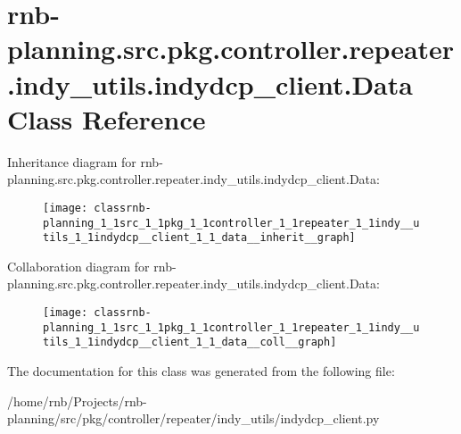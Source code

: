 \hypertarget{classrnb-planning_1_1src_1_1pkg_1_1controller_1_1repeater_1_1indy__utils_1_1indydcp__client_1_1_data}{}\section{rnb-\/planning.src.\+pkg.\+controller.\+repeater.\+indy\+\_\+utils.\+indydcp\+\_\+client.\+Data Class Reference}
\label{classrnb-planning_1_1src_1_1pkg_1_1controller_1_1repeater_1_1indy__utils_1_1indydcp__client_1_1_data}


Inheritance diagram for rnb-\/planning.src.\+pkg.\+controller.\+repeater.\+indy\+\_\+utils.\+indydcp\+\_\+client.\+Data\+:\nopagebreak
\begin{figure}[H]
\begin{center}
\leavevmode
\texttt{[image: classrnb-planning\_1\_1src\_1\_1pkg\_1\_1controller\_1\_1repeater\_1\_1indy\_\_utils\_1\_1indydcp\_\_client\_1\_1\_data\_\_inherit\_\_graph]}
\end{center}
\end{figure}


Collaboration diagram for rnb-\/planning.src.\+pkg.\+controller.\+repeater.\+indy\+\_\+utils.\+indydcp\+\_\+client.\+Data\+:\nopagebreak
\begin{figure}[H]
\begin{center}
\leavevmode
\texttt{[image: classrnb-planning\_1\_1src\_1\_1pkg\_1\_1controller\_1\_1repeater\_1\_1indy\_\_utils\_1\_1indydcp\_\_client\_1\_1\_data\_\_coll\_\_graph]}
\end{center}
\end{figure}


The documentation for this class was generated from the following file\+:\begin{DoxyCompactItemize}
\item 
/home/rnb/\+Projects/rnb-\/planning/src/pkg/controller/repeater/indy\+\_\+utils/indydcp\+\_\+client.\+py\end{DoxyCompactItemize}
